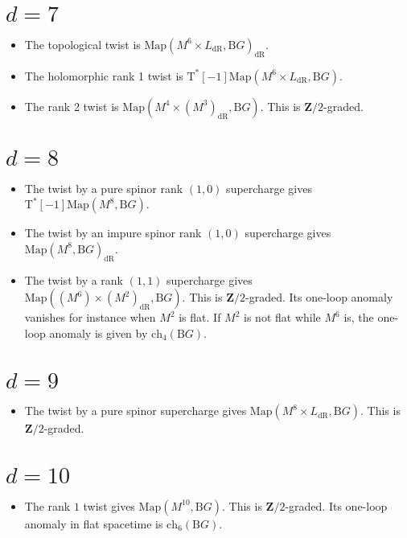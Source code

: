 \documentclass[12pt]{amsart}
\newcommand{\B}{\mathrm{B}}
\newcommand{\T}{\mathrm{T}}
\newcommand{\Z}{\mathbf{Z}}
\newcommand{\ch}{\mathrm{ch}}
\newcommand{\dR}{\mathrm{dR}}
\newcommand{\Map}{\mathrm{Map}}
\theoremstyle{definition}
\theoremstyle{remark}
\begin{document}
\section{$d=7$}

\begin{itemize}
\item The topological twist is $\Map(M^6\times L_{\dR}, \B G)_{\dR}$.

\item The holomorphic rank 1 twist is $\T^*[-1]\Map(M^6\times L_{\dR}, \B G)$.

\item The rank 2 twist is $\Map(M^4\times (M^3)_{\dR}, \B G)$. This is $\Z/2$-graded.
\end{itemize}

\section{$d=8$}

\begin{itemize}
\item The twist by a pure spinor rank $(1, 0)$ supercharge gives $\T^*[-1]\Map(M^8, \B G)$.

\item The twist by an impure spinor rank $(1, 0)$ supercharge gives $\Map(M^8, \B G)_{\dR}$.

\item The twist by a rank $(1, 1)$ supercharge gives $\Map((M^6)\times (M^2)_{\dR}, \B G)$. This is $\Z/2$-graded. Its one-loop anomaly vanishes for instance when $M^2$ is flat. If $M^2$ is not flat while $M^6$ is, the one-loop anomaly is given by $\ch_4(\B G)$.
\end{itemize}

\section{$d=9$}

\begin{itemize}
\item The twist by a pure spinor supercharge gives $\Map(M^8\times L_{\dR}, \B G)$. This is $\Z/2$-graded.
\end{itemize}

\section{$d=10$}

\begin{itemize}
\item The rank $1$ twist gives $\Map(M^{10}, \B G)$. This is $\Z/2$-graded. Its one-loop anomaly in flat spacetime is $\ch_6(\B G)$.
\end{itemize}
\end{document}
